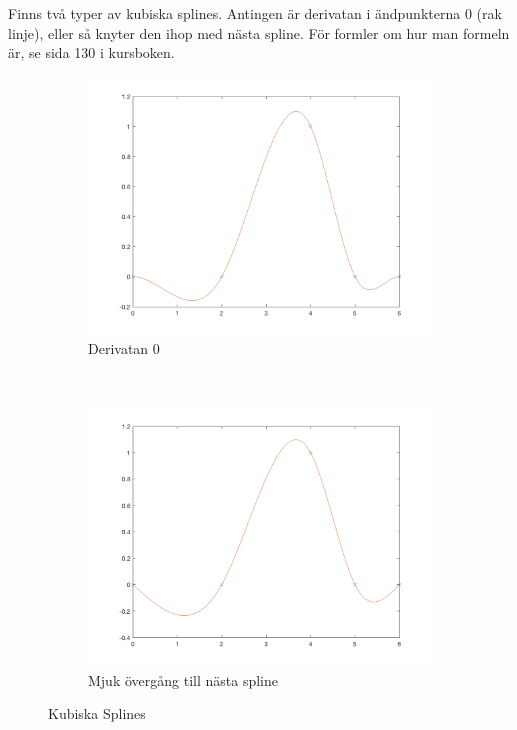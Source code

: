 \documentclass[12pt,a4paper]{article}
\begin{document}
Finns två typer av kubiska splines.
Antingen är derivatan i ändpunkterna 0 (rak linje), eller så knyter den ihop med nästa spline.
För formler om hur man formeln är, se sida 130 i kursboken.

\begin{figure}[H]
    \centering
    \begin{subfigure}[b]{0.45\textwidth}
        \includegraphics[width=\textwidth]{3-2}
        \caption{Derivatan 0}
    \end{subfigure}
    ~ %
    \begin{subfigure}[b]{0.45\textwidth}
        \includegraphics[width=\textwidth]{3-1}
        \caption{Mjuk övergång till nästa spline}
    \end{subfigure}
    \caption{Kubiska Splines}
\end{figure}
\end{document}
